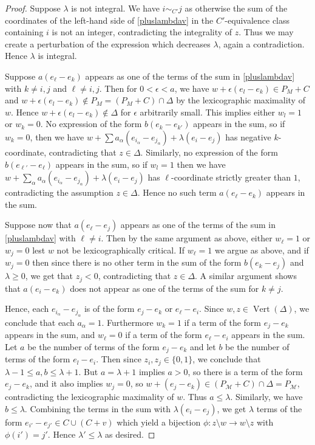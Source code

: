 \documentclass[12pt]{amsart}
\newcommand{\MM}{{\mathcal M}}
\newcommand{\Vt}{{\operatorname{Vert}}}
\theoremstyle{plain}
\theoremstyle{definition}
\theoremstyle{remark}
\begin{document}
\begin{proof}
Suppose $\lambda$ is not integral. We have $i\sim_{C'}j$ as otherwise the sum of the coordinates of the left-hand side of \eqref{pluslambdav} in the $C'$-equivalence class containing $i$ is not an integer, contradicting the integrality of $z$. Thus we may create a perturbation of the expression which decreases $\lambda$, again a contradiction.
Hence $\lambda$ is integral.

Suppose $a(e_\ell-e_k)$ appears as one of the terms of the sum in \eqref{pluslambdav} with $k \ne i,j$ and $\ell \ne i,j$. Then for $0<\epsilon<a$, we have $w+\epsilon(e_l-e_k) \in P_M+C$ and $w+\epsilon(e_l-e_k) \not \in P_M=(P_M+C)\cap \Delta$ by the lexicographic maximality of $w$. Hence $w+\epsilon(e_l-e_k) \not \in \Delta$ for $\epsilon$ arbitrarily small. This implies either $w_l=1$ or $w_k=0$. No expression of the form $b(e_k-e_{k'})$ appears in the sum, so if $w_k=0$, then we have $w+\sum a_\alpha (e_{i_\alpha}-e_{j_\alpha})+\lambda(e_i-e_j)$ has negative $k$-coordinate, contradicting that $z \in \Delta$. Similarly, no expression of the form $b(e_{\ell'}-e_\ell)$ appears in the sum, so if $w_l=1$ then we have $w+\sum_\alpha a_\alpha (e_{i_\alpha}-e_{j_\alpha})+\lambda(e_i-e_j)$ has $\ell$-coordinate strictly greater than $1$, contradicting the assumption $z \in \Delta$. Hence no such term $a(e_\ell-e_k)$ appears in the sum.

Suppose now that $a(e_\ell-e_j)$ appears as one of the terms of the sum in \eqref{pluslambdav} with $\ell \ne i$. Then by the same argument as above, either $w_\ell=1$ or $w_j=0$ lest $w$ not be lexicographically critical. If $w_\ell=1$ we argue as above, and if $w_j=0$ then since there is no other term in the sum of the form $b(e_k-e_j)$ and $\lambda \ge 0$, we get that $z_j<0$, contradicting that $z \in \Delta$. A similar argument shows that $a(e_i-e_k)$ does not appear as one of the terms of the sum for $k \ne j$.

Hence, each $e_{i_\alpha}-e_{j_\alpha}$ is of the form $e_j-e_k$ or $e_\ell-e_i$. Since $w,z \in \Vt(\Delta)$, we conclude that each $a_\alpha=1$. Furthermore $w_k=1$ if a term of the form $e_j-e_k$ appears in the sum, and $w_\ell=0$ if a term of the form $e_\ell-e_i$ appears in the sum. Let $a$ be the number of terms of the form $e_j-e_k$ and let $b$ be the number of terms of the form $e_l-e_i$. Then since $z_i,z_j \in \{0,1\}$, we conclude that $\lambda-1 \le a,b \le \lambda+1$. But $a=\lambda+1$ implies $a>0$, so there is a term of the form $e_j-e_k$, and it also implies $w_j=0$, so $w+(e_j-e_k)\in (P_\MM+C)\cap \Delta=P_\MM$, contradicting the lexicographic maximality of $w$. Thus $a \leq \lambda$. Similarly, we have $b \le \lambda$. Combining the terms in the sum with $\lambda(e_i-e_j)$, we get $\lambda$ terms of the form $e_{i'}-e_{j'} \in C \cup (C+v)$ which yield a bijection $\phi:z \setminus w \to w \setminus z$ with $\phi(i')=j'$. Hence $\lambda' \le \lambda$ as desired.
\end{proof}
\end{document}
